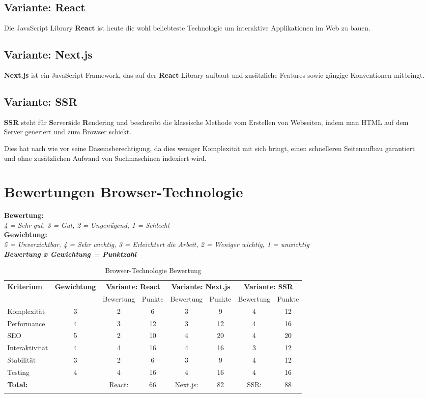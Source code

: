 \subsection{Variante: React}

Die JavaScript Library \textbf{React} ist heute die wohl beliebteste
Technologie um interaktive Applikationen im Web zu bauen.

\subsection{Variante: Next.js}

\textbf{Next.js} ist ein JavaScript Framework, das auf der \textbf{React}
Library aufbaut und zusätzliche Features sowie gängige Konventionen mitbringt.

\subsection{Variante: SSR}

\textbf{SSR} steht für \textbf{S}erver\textbf{s}ide \textbf{R}endering und
beschreibt die klassische Methode vom Erstellen von Webseiten, indem man HTML
auf dem Server generiert und zum Browser schickt.

Dies hat nach wie vor seine Daseinsberechtigung, da dies weniger Komplexität
mit sich bringt, einen schnelleren Seitenaufbau garantiert und ohne
zusätzlichen Aufwand von Suchmaschinen indexiert wird.

\clearpage
\section{Bewertungen Browser-Technologie}\label{bewertungen-browser-technologie}

\textbf{Bewertung:}\\
\textit{4 = Sehr gut, 3 = Gut, 2 = Ungenügend, 1 = Schlecht}\\
\textbf{Gewichtung:}\\
\textit{5 = Unverzichtbar, 4 = Sehr wichtig, 3 = Erleichtert die Arbeit, 2 = Weniger wichtig, 1 = unwichtig}\\

\textbf{\textit{Bewertung x Gewichtung = Punktzahl}}

\begin{longtable}[]{@{}p{2cm}ccccccc@{}}
  \toprule
  \textbf{Kriterium} & \textbf{Gewichtung} & \multicolumn{2}{c}{\textbf{Variante: React}} & \multicolumn{2}{c}{\textbf{Variante: Next.js}} & \multicolumn{2}{c}{\textbf{Variante: SSR}}\tabularnewline
  & & Bewertung & Punkte & Bewertung & Punkte & Bewertung & Punkte \tabularnewline
  \midrule
  \endhead
  Komplexität & 3 & 2 & 6 & 3 & 9 & 4 & 12 \tabularnewline
  Performance & 4 & 3 & 12 & 3 & 12 & 4 & 16 \tabularnewline
  SEO & 5 & 2 & 10 & 4 & 20 & 4 & 20 \tabularnewline
  Interaktivität & 4 & 4 & 16 & 4 & 16 & 3 & 12 \tabularnewline
  Stabilität & 3 & 2 & 6 & 3 & 9 & 4 & 12 \tabularnewline
  Testing & 4 & 4 & 16 & 4 & 16 & 4 & 16 \tabularnewline
  \midrule
  \textbf{Total:} & & React: & 66 & Next.js: & 82 & SSR: & 88 \tabularnewline
  \bottomrule
  \caption{Browser-Technologie Bewertung}
\end{longtable}

